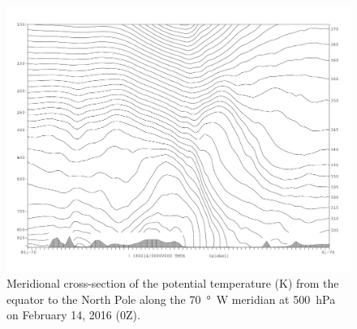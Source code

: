 \documentclass[11pt]{article}
\begin{document}
\begin{figure}[h!]
	\centering
	\includegraphics[width=\textwidth]{thta_0-90N_70W}
	\caption{Meridional cross-section of the potential temperature (K) from the equator to the North Pole along the \SI{70}{\degree W} meridian at \SI{500}{\hecto\Pa} on February 14, 2016 (0Z).}
	\label{fig:thta_xsec}
\end{figure}
\end{document}

